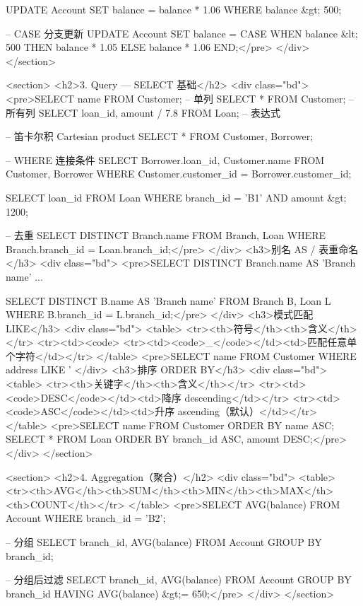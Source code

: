 {UPDATE Account SET balance = balance * 1.06
WHERE  balance &gt; 500;

-- CASE 分支更新
UPDATE Account
SET balance = CASE
    WHEN balance &lt; 500 THEN balance * 1.05
    ELSE balance * 1.06
END;</pre>
    </div>
  </section>

  <section>
    <h2>3. Query — SELECT 基础</h2>
    <div class="bd">
<pre>SELECT name FROM Customer;             -- 单列
SELECT *    FROM Customer;             -- 所有列
SELECT loan_id, amount / 7.8 FROM Loan; -- 表达式

-- 笛卡尔积 Cartesian product
SELECT * FROM Customer, Borrower;

-- WHERE 连接条件
SELECT Borrower.loan_id, Customer.name
FROM   Customer, Borrower
WHERE  Customer.customer_id = Borrower.customer_id;

SELECT loan_id FROM Loan
WHERE  branch_id = 'B1' AND amount &gt; 1200;

-- 去重
SELECT DISTINCT Branch.name
FROM   Branch, Loan
WHERE  Branch.branch_id = Loan.branch_id;</pre>
    </div>
    <h3>别名 AS / 表重命名</h3>
    <div class="bd">
<pre>SELECT DISTINCT Branch.name AS 'Branch name' ...

SELECT DISTINCT B.name AS 'Branch name'
FROM   Branch B, Loan L
WHERE  B.branch_id = L.branch_id;</pre>
    </div>
    <h3>模式匹配 LIKE</h3>
    <div class="bd">
      <table>
        <tr><th>符号</th><th>含义</th></tr>
        <tr><td><code>%
        <tr><td><code>_</code></td><td>匹配任意单个字符</td></tr>
      </table>
<pre>SELECT name FROM Customer
WHERE  address LIKE '%
    </div>
    <h3>排序 ORDER BY</h3>
    <div class="bd">
      <table>
        <tr><th>关键字</th><th>含义</th></tr>
        <tr><td><code>DESC</code></td><td>降序 descending</td></tr>
        <tr><td><code>ASC</code></td><td>升序 ascending（默认）</td></tr>
      </table>
<pre>SELECT name FROM Customer ORDER BY name ASC;
SELECT * FROM Loan
ORDER BY branch_id ASC, amount DESC;</pre>
    </div>
  </section>

  <section>
    <h2>4. Aggregation（聚合）</h2>
    <div class="bd">
      <table>
        <tr><th>AVG</th><th>SUM</th><th>MIN</th><th>MAX</th><th>COUNT</th></tr>
      </table>
<pre>SELECT AVG(balance) FROM Account
WHERE  branch_id = 'B2';

-- 分组
SELECT branch_id, AVG(balance)
FROM   Account
GROUP  BY branch_id;

-- 分组后过滤
SELECT branch_id, AVG(balance)
FROM   Account
GROUP  BY branch_id
HAVING AVG(balance) &gt;= 650;</pre>
    </div>
  </section>

}
